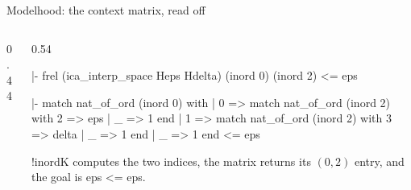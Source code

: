 \documentclass[10pt,aspectratio=169]{beamer}
\newcommand{\rid}[1]{{\ttfamily\small #1}}
\begin{document}
            \begin{frame}[fragile]{Modelhood: the context matrix, read off}
                \begin{columns}[T]
                    \begin{column}{0.44\textwidth}
                    \end{column}
                    \begin{column}{0.54\textwidth}
                        \begin{goalbox}[title={after \texttt{apply: (le\_trans
                            (interpretation\_nexp rho (inord 0) (inord 2)))}}]
                            \begin{gconc}
|- frel (ica_interp_space Heps Hdelta) (inord 0) (inord 2) <= eps
                            \end{gconc}
                        \end{goalbox}
                        \begin{goalbox}[title={after
                            \texttt{rewrite /= /ica\_interp\_rel}}]
                            \begin{gconc}
|- match nat_of_ord (inord 0) with
   | 0 => match nat_of_ord (inord 2) with 2 => eps | _ => 1 end
   | 1 => match nat_of_ord (inord 2) with 3 => delta | _ => 1 end
   | _ => 1
   end <= eps
                            \end{gconc}
                        \end{goalbox}
                        {\footnotesize \rid{!inordK} computes the two indices,
                            the matrix returns its $(0,2)$ entry, and the goal
                        is \rid{eps <= eps}.}
                    \end{column}
                \end{columns}
            \end{frame}
\end{document}
